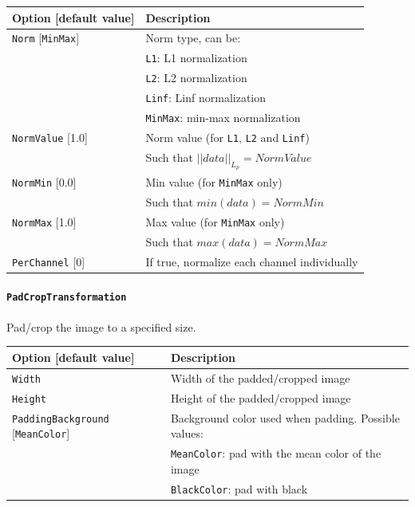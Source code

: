 \documentclass[a4paper,11pt,oneside]{article}
\begin{document}
\begin{center}
 \begin{tabular}{| p{5cm} | p{10cm} | }
 \hline
 Option [default value] & Description\\
 \hline\hline
  \lstinline!Norm! [\lstinline!MinMax!] & Norm type, can be: \\
   & \lstinline!L1!: L1 normalization \\
   & \lstinline!L2!: L2 normalization \\
   & \lstinline!Linf!: Linf normalization \\
   & \lstinline!MinMax!: min-max normalization \\
  \lstinline!NormValue! [1.0] & Norm value (for \lstinline!L1!, \lstinline!L2!
   and \lstinline!Linf!) \\
   & Such that $||data||_{L_{p}} = NormValue$ \\
  \lstinline!NormMin! [0.0] & Min value (for \lstinline!MinMax! only) \\
   & Such that $min(data) = NormMin$ \\
  \lstinline!NormMax! [1.0] & Max value (for \lstinline!MinMax! only) \\
   & Such that $max(data) = NormMax$ \\
  \lstinline!PerChannel! [0] & If true, normalize each channel individually \\
 \hline
\end{tabular}
\end{center}


\paragraph{\texorpdfstring{%
\lstinline[basicstyle=\ttfamily\bfseries]!PadCropTransformation!}
{PadCropTransformation}}
Pad/crop the image to a specified size.

\begin{center}
 \begin{tabular}{| p{5cm} | p{10cm} | }
 \hline
 Option [default value] & Description\\
 \hline\hline
  \cellcolor{requiredcolor}\lstinline!Width! & Width of the padded/cropped
  image \\
  \cellcolor{requiredcolor}\lstinline!Height! & Height of the padded/cropped
   image \\
  \lstinline!PaddingBackground! [\lstinline!MeanColor!] & Background color
  used when padding. Possible values: \\
   & \lstinline!MeanColor!: pad with the mean color of the image \\
   & \lstinline!BlackColor!: pad with black \\
 \hline
\end{tabular}
\end{center}
\end{document}
